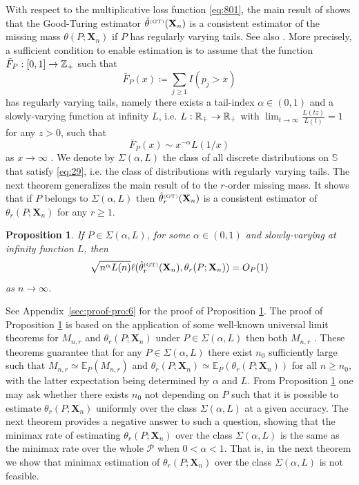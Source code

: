 \documentclass{article}
\newtheorem{proposition}{Proposition}
\newcommand{\1}{\boldsymbol{1}}
\newcommand{\EE}{\mathbb{E}}
\theoremstyle{plain}
\begin{document}
With respect to the multiplicative loss function \eqref{eq:801}, the main result of \cite{Oha(12)} shows that the Good-Turing estimator $\hat{\theta}^{\text{\tiny{(GT)}}}(\mathbf{X}_{n})$ is a consistent estimator of the missing mass $\theta(P;\mathbf{X}_{n})$ if $P$ has regularly varying tails. See also \cite{Mos(15)}. More precisely, a sufficient condition to enable estimation is to assume that the function $\bar{F}_P : [0,1] \to \mathbb{Z}_{+}$ such that
\begin{displaymath}
  \bar{F}_P(x) \coloneqq \sum_{j\geq 1}I(p_j > x)
\end{displaymath}
has regularly varying tails, namely there exists a tail-index $\alpha \in (0,1)$ and a slowly-varying function at infinity $L$, i.e.  $L : \mathbb{R}_{+} \to \mathbb{R}_{+}$ with $\lim_{t \to \infty} \frac{L(tz)}{L(t)} = 1$ for any $z>0$, such that
\begin{equation}
  \label{eq:29}
  \bar{F}_P(x) \sim x^{-\alpha}L(1/x)
\end{equation}
as $x \to \infty$  \cite{Bin(87),Gne(07)}. We denote by $\Sigma(\alpha,L)$ the class of all discrete distributions on $\mathbb{S}$ that satisfy \eqref{eq:29}, i.e. the class of distributions with regularly varying tails. The next theorem generalizes the main result of \cite{Oha(12)} to the $r$-order missing mass. It shows that if $P$ belongs to $\Sigma(\alpha,L)$ then $\hat{\theta}_{r}^{\text{\tiny{(GT)}}}(\mathbf{X}_{n})$ is a consistent estimator of $\theta_{r}(P;\mathbf{X}_{n})$ for any $r\geq1$.

\begin{proposition}
  \label{pro:6}
  If $P \in \Sigma(\alpha,L)$, for some $\alpha \in (0,1)$ and slowly-varying at infinity function $L$, then
  \begin{displaymath}
    \sqrt{n^{\alpha}L(n)}\ell(\hat{\theta}_{r}^{\text{\tiny{(GT)}}}(\mathbf{X}_{n}),\theta_r(P;\mathbf{X}_n)) = O_P(1)
  \end{displaymath}
  as $n\to \infty$.
\end{proposition}

See Appendix~\ref{sec:proof-pro:6} for the proof of Proposition \ref{pro:6}. The proof of Proposition \ref{pro:6} is based on the application of some well-known universal limit theorems for $M_{n,r}$ and $\theta_r(P;\mathbf{X}_n)$ under $P \in \Sigma(\alpha,L)$ then both $M_{n,r}$ \cite{Kar(67),Gne(07)}. These theorems guarantee that for any $P \in \Sigma(\alpha,L)$ there exist $n_0$ sufficiently large such that $M_{n,r} \simeq \EE_P(M_{n,r})$ and $\theta_r(P;\mathbf{X}_n) \simeq \EE_P(\theta_r(P;\mathbf{X}_n))$ for all $n \geq n_0$, with the latter expectation being determined by $\alpha$ and $L$. From Proposition \ref{pro:6} one may ask whether there exists $n_{0}$ not depending on $P$ such that it is possible to estimate $\theta_r(P;\mathbf{X}_n)$ uniformly over the class $\Sigma(\alpha,L)$ at a given accuracy. The next theorem provides a negative answer to such a question, showing that the minimax rate of estimating $\theta_r(P;\mathbf{X}_n)$ over the class $\Sigma(\alpha,L)$ is the same as the minimax rate over the whole $\mathcal{P}$ when $0 < \alpha < 1$. That is, in the next theorem we show that minimax estimation of $\theta_r(P;\mathbf{X}_{n})$ over the class $\Sigma(\alpha,L)$ is not feasible.
\end{document}
